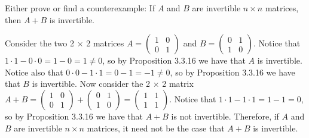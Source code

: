\documentclass[12pt]{article}
\newenvironment{problem}[2][Problem]
{
	\begin{trivlist} 
		\item[\hskip \labelsep {\bfseries #1 #2:}]
	}
{
	\end{trivlist}
	}
\newenvironment{solution}[1][Solution]
{
	\begin{trivlist} 
		\item[\hskip \labelsep {\itshape #1:}]
	}
	{
	\end{trivlist}
}
\begin{document}
\newpage
\begin{problem}{4}
Either prove or find a counterexample: If $A$ and $B$ are invertible $n\times n$ matrices, then $A+B$ is invertible.
\noindent
\newline
\newline
\begin{solution}
Consider the two 2 $\times$ 2 matrices $A=\begin{pmatrix} 1&0\\0&1 \end{pmatrix}$ and $B=\begin{pmatrix} 0&1\\1&0 \end{pmatrix}$. Notice that $1\cdot 1 - 0\cdot 0 = 1-0=1\neq 0$, so by Proposition 3.3.16 we have that $A$ is invertible. Notice also that $0\cdot 0 - 1\cdot 1 = 0-1=-1\neq 0$, so by Proposition 3.3.16 we have that $B$ is invertible. Now consider the 2 $\times$ 2 matrix $A+B = \begin{pmatrix} 1&0\\0&1 \end{pmatrix} + \begin{pmatrix} 0&1\\1&0 \end{pmatrix}=\begin{pmatrix} 1&1\\1&1 \end{pmatrix}$. Notice that $1\cdot 1 - 1\cdot 1 =1 -1 =0$, so by Proposition 3.3.16 we have that $A+B$ is not invertible. Therefore, if $A$ and $B$ are invertible $n\times n$ matrices, it need not be the case that $A+B$ is invertible.
\end{solution}
\end{problem}
\end{document}
